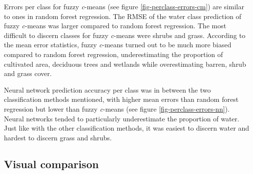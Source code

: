 \documentclass[a4paper,12pt]{scrbook}
\begin{document}
Errors per class for fuzzy \textit{c}-means (see figure \ref{fig-perclass-errors-cm}) are similar to ones in random forest regression. The RMSE of the water class prediction of fuzzy \textit{c}-means was larger compared to random forest regression. The most difficult to discern classes for fuzzy \textit{c}-means were shrubs and grass. According to the mean error statistics, fuzzy \textit{c}-means turned out to be much more biased compared to random forest regression, underestimating the proportion of cultivated area, deciduous trees and wetlands while overestimating barren, shrub and grass cover.

Neural network prediction accuracy per class was in between the two classification methods mentioned, with higher mean errors than random forest regression but lower than fuzzy \textit{c}-means (see figure \ref{fig-perclass-errors-nn}). Neural networks tended to particularly underestimate the proportion of water. Just like with the other classification methods, it was easiest to discern water and hardest to discern grass and shrubs.

\subsection{Visual comparison}
\end{document}
